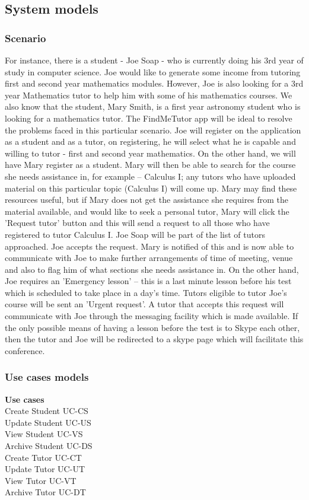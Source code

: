 \documentclass[12pt]{article}
\begin{document}
\subsection{System models}
\subsubsection{Scenario}
\begin{flushleft}
For instance, there is a student - Joe Soap - who is currently doing his  3rd year of study in computer science.  Joe would like to generate some income from tutoring first and second year mathematics modules. However, Joe is also looking for a 3rd year Mathematics tutor to help him with some of his mathematics courses. We also know that the student, Mary Smith, is a first year astronomy student who is looking for a mathematics tutor. The FindMeTutor app will be ideal to resolve the problems faced in this particular scenario. Joe will register on the application as a student and as a tutor, on registering, he will select what he is capable and willing to tutor - first and second year mathematics. On the other hand, we will have Mary register as a student. Mary will then be able to search for the course she needs assistance in, for example – Calculus I; any tutors who have uploaded material on this particular topic (Calculus I) will come up. Mary may find these resources useful, but if Mary does not get the assistance she requires from the material available, and would like to seek a personal tutor, Mary will click the 'Request tutor' button and this will send a request to all those who have registered to tutor Calculus I. Joe Soap will be part of the list of tutors approached. Joe accepts the request. Mary is notified of this and is now able to communicate with Joe to make further arrangements of time of meeting, venue and also to flag him of what sections she needs assistance in. On the other hand, Joe requires an 'Emergency lesson' – this is a last minute lesson before his test which is scheduled to take place in a day's time. Tutors eligible to tutor Joe's course will be sent an 'Urgent request'. A tutor that accepts this request will communicate with Joe through the messaging facility which is made available. If the only possible means of having a lesson before the test is to Skype each other, then the tutor and Joe will be redirected to a skype page which will facilitate this conference.
\end{flushleft}


\subsubsection{Use cases models}
\textbf{Use cases}	\\		
			Create Student		UC-CS
			\\Update Student 	UC-US
			\\View Student      UC-VS
			\\Archive Student	UC-DS
			\\Create Tutor		UC-CT
			\\Update Tutor		UC-UT
			\\View Tutor			UC-VT
			\\Archive Tutor		UC-DT
			\\			
		
\end{document}
